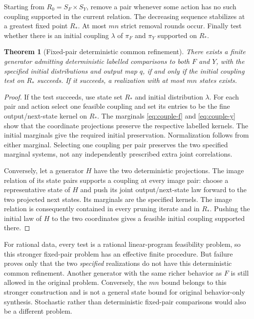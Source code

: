 \documentclass[11pt]{article}
\newtheorem{theorem}{Theorem}[section]
\begin{document}
Starting from $R_0=S_F\times S_Y$, remove a pair whenever some action has no such coupling supported in the current relation. The decreasing sequence stabilizes at a greatest fixed point $R_*$. At most $mn$ strict removal rounds occur. Finally test whether there is an initial coupling $\lambda$ of $\pi_F$ and $\pi_Y$ supported on $R_*$.

\begin{theorem}[Fixed-pair deterministic common refinement]
There exists a finite generator admitting deterministic labelled comparisons to both $F$ and $Y$, with the specified initial distributions and output map $q$, if and only if the initial coupling test on $R_*$ succeeds. If it succeeds, a realization with at most $mn$ states exists.
\end{theorem}
\begin{proof}
If the test succeeds, use state set $R_*$ and initial distribution $\lambda$. For each pair and action select one feasible coupling and set its entries to be the fine output/next-state kernel on $R_*$. The marginals \eqref{eq:couple-f} and \eqref{eq:couple-y} show that the coordinate projections preserve the respective labelled kernels. The initial marginals give the required initial preservation. Normalization follows from either marginal. Selecting one coupling per pair preserves the two specified marginal systems, not any independently prescribed extra joint correlations.

Conversely, let a generator $H$ have the two deterministic projections. The image relation of its state pairs supports a coupling at every image pair: choose a representative state of $H$ and push its joint output/next-state law forward to the two projected next states. Its marginals are the specified kernels. The image relation is consequently contained in every pruning iterate and in $R_*$. Pushing the initial law of $H$ to the two coordinates gives a feasible initial coupling supported there.
\end{proof}

For rational data, every test is a rational linear-program feasibility problem, so this stronger fixed-pair problem has an effective finite procedure. But failure proves only that the two \emph{specified} realizations do not have this deterministic common refinement. Another generator with the same richer behavior as $F$ is still allowed in the original problem. Conversely, the $mn$ bound belongs to this stronger construction and is not a general state bound for original behavior-only synthesis. Stochastic rather than deterministic fixed-pair comparisons would also be a different problem.
\end{document}
